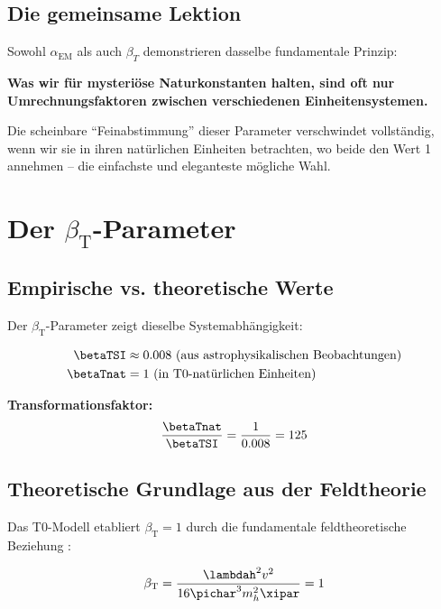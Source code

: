 \subsection{Die gemeinsame Lektion}
\label{subsec:common_lesson}

Sowohl $\alpha_{\text{EM}}$ als auch $\beta_T$ demonstrieren dasselbe fundamentale Prinzip:

\textbf{Was wir für mysteriöse Naturkonstanten halten, sind oft nur Umrechnungsfaktoren zwischen verschiedenen Einheitensystemen.}

Die scheinbare ``Feinabstimmung'' dieser Parameter verschwindet vollständig, wenn wir sie in ihren natürlichen Einheiten betrachten, wo beide den Wert 1 annehmen -- die einfachste und eleganteste mögliche Wahl.
	\section{Der $\beta_{\text{T}}$-Parameter}
	\label{sec:beta_t}
	
	\subsection{Empirische vs. theoretische Werte}
	\label{subsec:beta_empirisch_theoretisch}
	
	Der $\beta_{\text{T}}$-Parameter zeigt dieselbe Systemabhängigkeit:
	
	\begin{align}
		\betaTSI &\approx 0.008 \text{ (aus astrophysikalischen Beobachtungen)} \\
		\betaTnat &= 1 \text{ (in T0-natürlichen Einheiten)}
	\end{align}
	
	\textbf{Transformationsfaktor:}
	$$\frac{\betaTnat}{\betaTSI} = \frac{1}{0.008} = 125$$
	
	\subsection{Theoretische Grundlage aus der Feldtheorie}
	\label{subsec:beta_feldtheorie}
	
	Das T0-Modell etabliert $\beta_{\text{T}} = 1$ durch die fundamentale feldtheoretische Beziehung \cite{pascher_derivation_beta_2025}:
	
	\begin{equation}
		\beta_{\text{T}} = \frac{\lambdah^2 v^2}{16\pichar^3 m_h^2 \xipar} = 1
		\label{eq:beta_t_feldtheorie}
	\end{equation}
	
